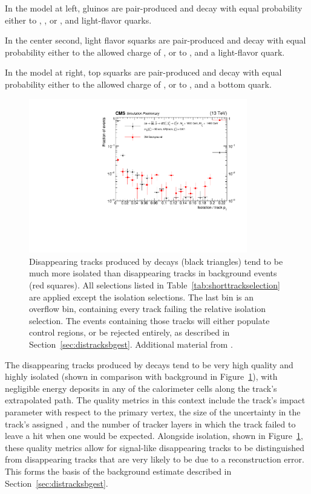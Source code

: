   In the model at left, gluinos are pair-produced and decay with equal probability either to \chip, \chim, or \lsp, and light-flavor quarks.

  In the center second, light flavor squarks are pair-produced and decay with equal probability either to the allowed charge of \chargino, or to \lsp, and a light-flavor quark.

  In the model at right, top squarks are pair-produced and decay with equal probability either to the allowed charge of \chargino, or to \lsp, and a bottom quark.

  \begin{figure}[h!]
    \centering
    \includegraphics[width=0.85\textwidth]{figures/reliso_SvsB.pdf}
    \caption[Comparison of signal and background Short Track relative isolation distributions.]
            {Disappearing tracks produced by \chargino decays (black triangles) tend to be much more isolated than disappearing tracks in background events (red squares).
              All selections listed in Table~\ref{tab:shorttrackselection} are applied except the isolation selections.
              The last bin is an overflow bin, containing every track failing the relative isolation selection.
              The events containing those tracks will either populate control regions, or be rejected entirely, as described in Section~\ref{sec:distracksbgest}.
              Additional material from \cite{MT2_2019}.}
            \label{fig:distracksisolation}
  \end{figure}  

  The disappearing tracks produced by \chargino decays tend to be very high quality and highly isolated (shown in comparison with background in Figure~\ref{fig:distracksisolation}), with negligible energy deposits in any of the calorimeter cells along the track's extrapolated path.
  The quality metrics in this context include the track's impact parameter with respect to the primary vertex, the size of the uncertainty in the track's assigned \pt, and the number of tracker layers in which the track failed to leave a hit when one would be expected.
  Alongside isolation, shown in Figure~\ref{fig:distracksisolation}, these quality metrics allow for signal-like disappearing tracks to be distinguished from disappearing tracks that are very likely to be due to a reconstruction error.
  This forms the basis of the background estimate described in Section~\ref{sec:distracksbgest}.

